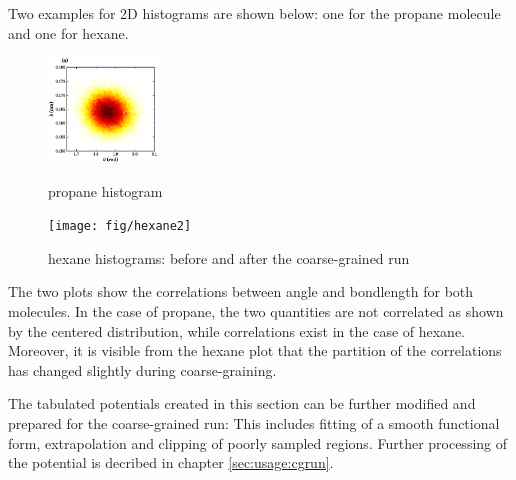 Two examples for 2D histograms are shown below: one for the propane molecule and one for hexane.

\begin{figure}[h]
\hspace{1cm}
\begin{minipage}{4cm}
  \includegraphics[height=2.8cm]{fig/propane_hist2d}
  \caption{propane histogram}
  \label{boltzmann:propane}
\end{minipage}
\hfill
\begin{minipage}{10cm}
  \texttt{[image: fig/hexane2]}
  \caption{hexane histograms: before and after the coarse-grained run}
  \label{boltzmann:hexane}
\end{minipage}
\end{figure}

The two plots show the correlations between angle and bondlength for both molecules. In the case of propane, the two quantities are not correlated as shown by the centered distribution, while correlations exist in the case of hexane. Moreover, it is visible from the hexane plot that the partition of the correlations has changed slightly during coarse-graining.

The tabulated potentials created in this section can be further modified and prepared for the coarse-grained run: This includes fitting of a smooth functional form, extrapolation and clipping of poorly sampled regions. Further processing of the potential is decribed in chapter \ref{sec:usage:cgrun}.